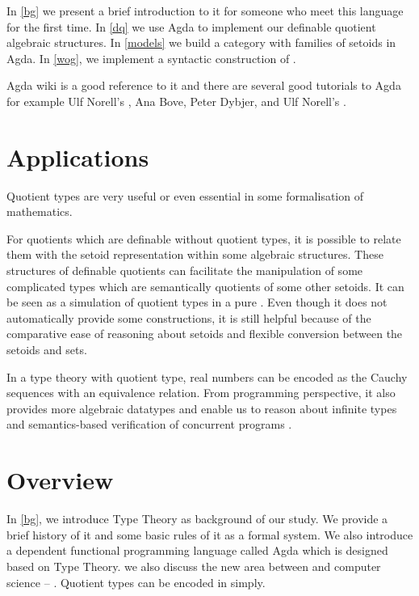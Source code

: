 In \autoref{bg} we present a brief introduction to it for someone
who meet this language for the first time. In \autoref{dq} we use Agda to implement our definable quotient algebraic structures. In \autoref{models} we build a category with families of setoids in Agda. In \autoref{wog}, we implement a syntactic construction of \wog.

Agda wiki\cite{agdawiki:main} is a good reference to it and there are
several good tutorials to Agda for example Ulf Norell's
\cite{tutorial}, Ana Bove, Peter Dybjer, and Ulf Norell's \cite{bove2009brief}.



\section{Applications}


Quotient types are very useful or even essential in some formalisation of mathematics. 

For quotients which are definable without quotient types, it is
possible to relate them with the setoid representation within some
algebraic structures. 
These structures of definable quotients can facilitate the
manipulation of some complicated types which
are semantically quotients of some other setoids. It can be seen as a
simulation of quotient types in a pure \itt. Even though it does not
automatically provide some constructions, it is still helpful because
of the comparative ease of reasoning about setoids and flexible
conversion between the setoids and sets.


In a type theory with quotient type, real numbers can be encoded as
the Cauchy sequences with an equivalence relation.
From programming perspective,  it also provides more algebraic
datatypes and enable us to reason about infinite types and
semantics-based verification of concurrent programs \cite{hof:phd}.


\section{Overview}





In \autoref{bg}, we introduce Type Theory as background of our study. We provide a brief
history of it and some basic rules of it as a formal system.
We also introduce a dependent functional
programming language called Agda which is designed based on Type Theory.
we also discuss the new area between \maths and
computer science -- \hott. Quotient types can be encoded in \hott simply.


